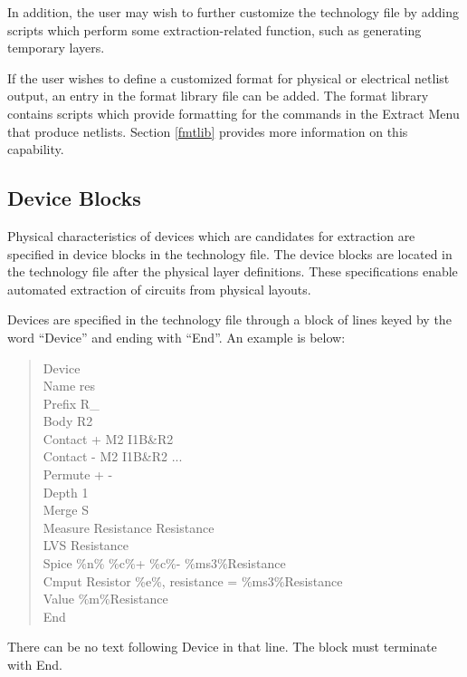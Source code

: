 In addition, the user may wish to further customize the technology
file by adding scripts which perform some extraction-related function,
such as generating temporary layers.

If the user wishes to define a customized format for physical or
electrical netlist output, an entry in the format library file can be
added.  The format library contains scripts which provide formatting
for the commands in the {\cb Extract Menu} that produce netlists. 
Section \ref{fmtlib} provides more information on this capability.


\subsection{Device Blocks}
\label{devblock}
Physical characteristics of devices which are candidates for
extraction are specified in device blocks in the technology file.  The
device blocks are located in the technology file after the physical
layer definitions.  These specifications enable automated extraction
of circuits from physical layouts.

Devices are specified in the technology file through a block of lines
keyed by the word ``{\vt Device}'' and ending with ``{\vt End}''.  An
example is below:

\begin{quote}\rr\vt
Device\\
Name res\\
Prefix R\_\\
Body R2\\
Contact + M2 I1B\&R2\\
Contact - M2 I1B\&R2 ...\\
Permute + -\\
Depth 1\\
Merge S\\
Measure Resistance Resistance\\
LVS Resistance\\
Spice \%n\% \%c\%+ \%c\%- \%ms3\%Resistance\\
Cmput Resistor \%e\%, resistance = \%ms3\%Resistance\\
Value \%m\%Resistance\\
End\\
\end{quote}

There can be no text following {\vt Device} in that line.  The block
must terminate with {\vt End}.

